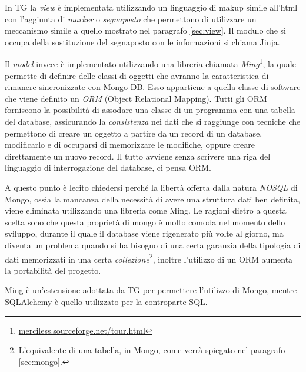 In TG la \emph{view} è implementata utilizzando un linguaggio di makup simile all'html con l'aggiunta di \emph{marker} o \emph{segnaposto} che permettono di utilizzare un meccanismo simile a quello mostrato nel paragrafo \ref{sec:view}. Il modulo che si occupa della sostituzione del segnaposto con le informazioni si chiama Jinja.

Il \emph{model} invece è implementato utilizzando una libreria chiamata \emph{Ming}\footnote{\url{merciless.sourceforge.net/tour.html}}, la quale permette di definire delle classi di oggetti che avranno la caratteristica di rimanere sincronizzate con Mongo DB. Esso appartiene a quella classe di software che viene definito un \emph{ORM} (Object Relational Mapping). Tutti gli ORM forniscono la possibilità di assodare una classe di un programma con una tabella del database, assicurando la \emph{consistenza} nei dati che si raggiunge con tecniche che permettono di creare un oggetto a partire da un record di un database, modificarlo e di occuparsi di memorizzare le modifiche, oppure creare direttamente un nuovo record. Il tutto avviene senza scrivere una riga del linguaggio di interrogazione del database, ci pensa ORM. 

A questo punto è lecito chiedersi perché la libertà offerta dalla natura \emph{NOSQL} di Mongo, ossia la mancanza della necessità di avere una struttura dati ben definita, viene eliminata utilizzando una libreria come Ming. Le ragioni dietro a questa scelta sono che questa proprietà di mongo è molto comoda nel momento dello sviluppo, durante il quale il database viene rigenerato più volte al giorno, ma diventa un problema quando si ha bisogno di una certa garanzia della tipologia di dati memorizzati in una certa \emph{collezione}\footnote{L'equivalente di una tabella, in Mongo, come verrà spiegato nel paragrafo \ref{sec:mongo}.}, inoltre l'utilizzo di un ORM aumenta la portabilità del progetto.

Ming è un'estensione adottata da TG per permettere l'utilizzo di Mongo, mentre SQLAlchemy è quello utilizzato per la controparte SQL.

